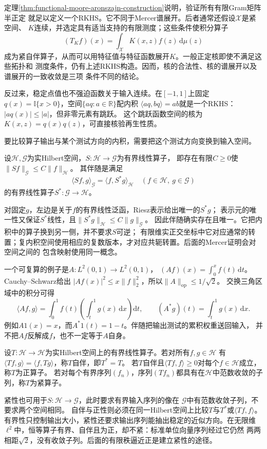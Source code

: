 定理\ref{thm:functional-moore-aronszajn-construction}说明，验证所有有限Gram矩阵半正定
就足以定义一个RKHS。它不同于Mercer谱展开。后者通常还假设$\mathcal{X}$是紧空间、
$K$连续，并选定具有适当支持的有限测度；这些条件使积分算子
\[
  (T_Kf)(x)
  =
  \int_{\mathcal{X}}K(x,z)f(z)\,\mathrm{d}\mu(z)
\]
成为紧自伴算子，从而可以用特征值与特征函数展开$K$。一般正定核即使不满足这些拓扑和
测度条件，仍有上述RKHS构造。因而，核的合法性、核的谱展开以及谱展开的一致收敛是三项
条件不同的结论。

反过来，稳定点值也不强迫函数关于输入连续。在$[-1,1]$上固定
$q(x)=\mathbb I\{x>0\}$，空间$\{a q:a\in\mathbb R\}$配内积
$\langle aq,bq\rangle=ab$就是一个RKHS：$|aq(x)|\leq|a|$，但非零元素有跳跃。
这个跳跃函数空间的核为$K(x,z)=q(x)q(z)$，可直接核验再生性质。

要比较算子输出与某个测试方向的内积，需要把这个测试方向变换到输入空间。
\begin{definition}[Hilbert空间之间的伴随算子]
\label{def:functional-adjoint}
设$\mathcal H,\mathcal G$为实Hilbert空间，$S:\mathcal H\to\mathcal G$为有界线性算子，
即存在有限$C\geq0$使$\lVert Sf\rVert_{\mathcal G}\leq C\lVert f\rVert_{\mathcal H}$。
其伴随是满足
\[
 \langle Sf,g\rangle_{\mathcal G}
 =\langle f,S^*g\rangle_{\mathcal H}
 \quad(f\in\mathcal H,\ g\in\mathcal G)
\]
的有界线性算子$S^*:\mathcal G\to\mathcal H$。
\end{definition}
对固定$g$，左边是关于$f$的有界线性泛函，Riesz表示给出唯一的$S^*g$；
表示元的唯一性又保证$S^*$线性，且$\lVert S^*g\rVert_{\mathcal H}\leq C\lVert g\rVert_{\mathcal G}$。
因此伴随确实存在且唯一。它把内积中的算子换到另一侧，并不要求$S$可逆；
有限维实正交坐标中它对应通常的转置；复内积空间使用相应的复数版本，才对应共轭转置。后面的Mercer证明会对空间之间的
包含映射使用同一概念。

一个可复算的例子是$A:L^2(0,1)\to L^2(0,1)$，
$(Af)(x)=\int_0^x f(t)\,\mathrm dt$。Cauchy--Schwarz给出
$|Af(x)|^2\leq x\lVert f\rVert_2^2$，所以$\lVert A\rVert_{\mathrm{op}}\leq1/\sqrt2$。
交换三角区域中的积分可得
\[
 \langle Af,g\rangle
 =\int_0^1 f(t)\left(\int_t^1g(x)\,\mathrm dx\right)\mathrm dt,\qquad
 (A^*g)(t)=\int_t^1g(x)\,\mathrm dx.
\]
例如$A1(x)=x$，而$A^*1(t)=1-t$。伴随把输出测试的累积权重送回输入，
并不把$Af$反解成$f$，也不一定等于$A$自身。

\begin{definition}[自伴、正与紧算子]
\label{def:functional-operator-properties}
设$T:\mathcal H\to\mathcal H$为实Hilbert空间上的有界线性算子。若对所有$f,g\in\mathcal H$
有$\langle Tf,g\rangle=\langle f,Tg\rangle$，称$T$自伴，即$T^*=T$。
若$T$自伴且$\langle Tf,f\rangle\geq0$对每个$f\in\mathcal H$成立，称$T$为正算子。
若对每个有界序列$(f_n)$，序列$(Tf_n)$都具有在$\mathcal H$中范数收敛的子列，称$T$为紧算子。
\end{definition}
紧性也可用于$S:\mathcal H\to\mathcal G$，此时要求有界输入序列的像在
$\mathcal G$中有范数收敛子列，不要求两个空间相同。
自伴与正性则必须在同一Hilbert空间上比较$T$与$T^*$或$\langle Tf,f\rangle$。
有界性只控制输出大小，紧性还要求输出序列能抽出稳定的近似方向。在无限维
$\ell^2$中，恒等算子有界、自伴且为正，却不紧：标准单位向量序列经过它仍然
两两相距$\sqrt2$，没有收敛子列。后面的有限秩逼近正是建立紧性的途径。

